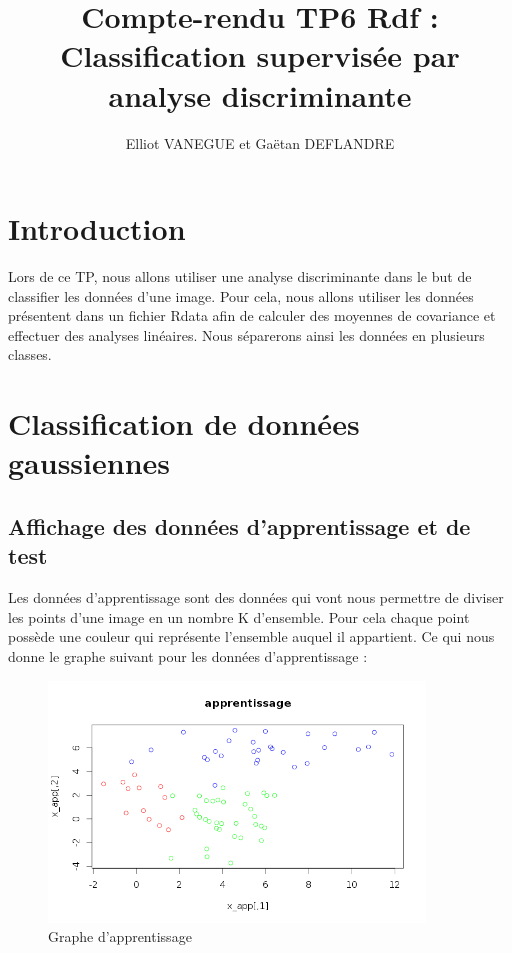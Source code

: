 \documentclass[a4paper,11pt]{article}
\title{Compte-rendu TP6 Rdf : Classification supervisée par analyse discriminante}
\author{Elliot VANEGUE et Gaëtan DEFLANDRE}
\begin{document}


  \maketitle
  
  \mbox{}
  \newpage
  \clearpage
  
  \section*{Introduction}
  Lors de ce TP, nous allons utiliser une analyse discriminante dans le but de classifier les données
  d'une image. Pour cela, nous allons utiliser les données présentent dans un fichier Rdata afin 
  de calculer des moyennes de covariance et effectuer des analyses linéaires. Nous séparerons
  ainsi les données en plusieurs classes.

  \section{Classification de données gaussiennes}
  \subsection{Affichage des données d'apprentissage et de test}
  Les données d'apprentissage sont des données qui vont nous permettre de diviser les points d'une
  image en un nombre K d'ensemble. Pour cela chaque point possède une couleur qui représente l'ensemble
  auquel il appartient.
  Ce qui nous donne le graphe suivant pour les données d'apprentissage : 
  
  \begin{figure}[h]
   \center
   \includegraphics[width=10cm]{ensemble_apprentissage.png}
   \caption{Graphe d'apprentissage}
  \end{figure}
\end{document}

